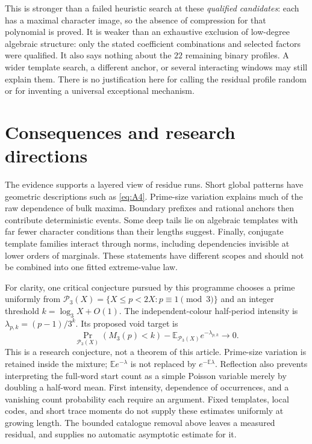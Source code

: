 \documentclass[11pt]{article}
\theoremstyle{definition}\newtheorem{definition}[theorem]{Definition}
\newcommand{\EE}{\mathbb E}
\begin{document}
This is stronger than a failed heuristic search at these
\emph{qualified candidates}: each has a maximal character image,
so the absence of compression for that polynomial is proved.
It is weaker than an exhaustive exclusion of low-degree algebraic
structure: only the stated coefficient combinations and selected
factors were qualified. It also says nothing about the $22$
remaining binary profiles. A wider template search, a different
anchor, or several interacting windows may still explain them.
There is no justification here for calling the residual profile
random or for inventing a universal exceptional mechanism.

\section{Consequences and research directions}\label{sec:consequences}
The evidence supports a layered view of residue runs. Short global
patterns have geometric descriptions such as \eqref{eq:A4}.
Prime-size variation explains much of the raw dependence of bulk
maxima. Boundary prefixes and rational anchors then contribute
deterministic events. Some deep tails lie on algebraic templates
with far fewer character conditions than their lengths suggest.
Finally, conjugate template families interact through norms,
including dependencies invisible at lower orders of marginals.
These statements have different scopes and should not be combined
into one fitted extreme-value law.

For clarity, one critical conjecture pursued by this
programme chooses a prime uniformly from
$\mathcal P_3(X)=\{X\le p<2X:p\equiv1\pmod3\}$
and an integer threshold $k=\log_3X+O(1)$.
The independent-colour half-period intensity is
$\lambda_{p,k}=(p-1)/3^k$. Its proposed void target is
\[
 \Pr_{\mathcal P_3(X)}(M_3(p)<k)
 -\EE_{\mathcal P_3(X)}e^{-\lambda_{p,k}}\longrightarrow0.
\]
This is a research conjecture, not a theorem
of this article. Prime-size
variation is retained inside the mixture;
$\EE e^{-\lambda}$ is not replaced by
$e^{-\EE\lambda}$. Reflection also prevents
interpreting the full-word start count as
a simple Poisson variable merely by doubling
a half-word mean. First intensity, dependence
of occurrences, and a vanishing count
probability each require an argument.
Fixed templates, local codes, and short
trace moments do not supply these estimates
uniformly at growing length. The bounded
catalogue removal above leaves a measured
residual, and supplies no automatic
asymptotic estimate for it.
\end{document}
